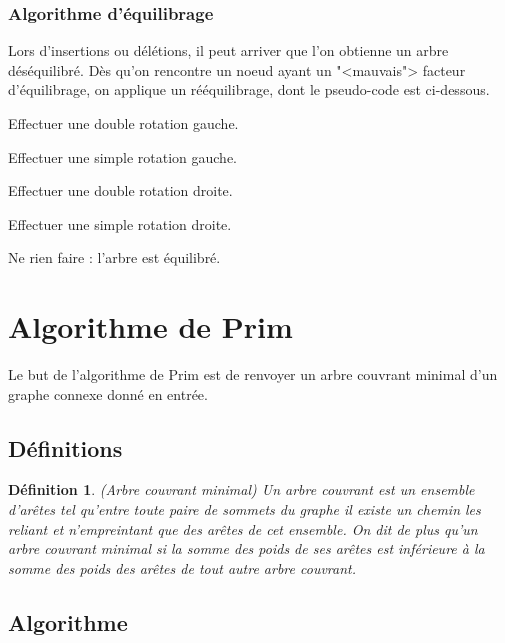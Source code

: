 \documentclass{article}
\newtheorem*{ddef}{Définition}
\begin{document}
\subsubsection{Algorithme d'équilibrage}
Lors d'insertions ou délétions, il peut arriver que l'on obtienne un arbre déséquilibré. Dès qu'on rencontre un noeud ayant un "<mauvais"> facteur d'équilibrage,
on applique un rééquilibrage, dont le pseudo-code est ci-dessous.

\begin{algorithmic}


Effectuer une double rotation gauche.
\Else

Effectuer une simple rotation gauche.

\EndIf
{}


Effectuer une double rotation droite.
\Else

Effectuer une simple rotation droite.
\EndIf
\Else

Ne rien faire : l'arbre est équilibré.
\EndIf
\end{algorithmic}




\section{Algorithme de Prim}
Le but de l'algorithme de Prim est de renvoyer un arbre couvrant minimal d'un graphe connexe donné en entrée.

\subsection{Définitions}

\begin{ddef}(Arbre couvrant minimal)
 Un arbre couvrant est un ensemble d'arêtes tel qu'entre toute paire de sommets du graphe il existe un chemin les reliant et n'empreintant que des arêtes de cet
 ensemble.
 On dit de plus qu'un arbre couvrant minimal si la somme des poids de ses arêtes est inférieure à la somme des poids des arêtes de tout autre arbre couvrant.
\end{ddef}

\subsection{Algorithme}
\end{document}
